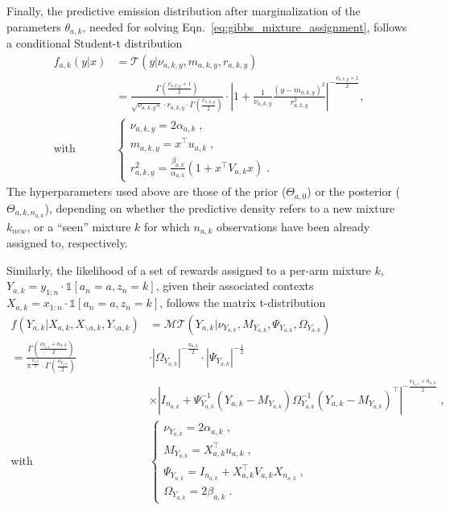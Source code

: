 \documentclass{article}
\newcommand{\mydet}[1]{\left| #1 \right|}
\newcommand{\T}[1]{\mathcal{T}\left( #1\right)}
\newcommand{\MT}[1]{\mathcal{MT}\left( #1\right)}
\begin{document}
Finally, the predictive emission distribution after marginalization of the parameters $\theta_{a,k}$, needed for solving Eqn.~\eqref{eq:gibbs_mixture_assignment}, follows a conditional Student-t distribution
\begin{equation}
\begin{split}
f_{a,k}(y|x) & = \T{y|\nu_{a,k,y}, m_{a,k,y}, r_{a,k,y}} \\
	&= \frac{\Gamma\left(\frac{\nu_{a,k,y}+1}{2}\right)}{\sqrt{\nu_{a,k,y} \pi} \cdot r_{a,k,y} \cdot \Gamma\left(\frac{\nu_{a,k,y}}{2}\right)} \cdot \mydet{1+\frac{1}{\nu_{a,k,y}}\frac{(y-m_{a,k,y})^2}{r_{a,k,y}^2}}^{-\frac{\nu_{a,k,y}+1}{2}} , \\
\text{with } &\begin{cases}
\nu_{a,k,y}=2\alpha_{a,k} \;, \\
m_{a,k,y} = x^\top u_{a,k} \;,\\
r_{a,k,y}^2 = \frac{\beta_{a,k}}{\alpha_{a,k}} (1+x^\top V_{a,k} x) \; .
\end{cases}
\end{split}
\end{equation}
The hyperparameters used above are those of the prior ($\Theta_{a,0}$) or the posterior ($\Theta_{a,k,n_{a,k}}$), depending on whether the predictive density refers to a new mixture $k_{new}$, or a ``seen'' mixture $k$ for which $n_{a,k}$ observations have been already assigned to, respectively.

Similarly, the likelihood of a set of rewards assigned to a per-arm mixture $k$, $Y_{a,k}=y_{1:n}\cdot \mathds{1}[a_n=a,z_n=k]$, given their associated contexts $X_{a,k}=x_{1:n} \cdot \mathds{1}[a_n=a,z_n=k]$, follows the matrix t-distribution
\begin{equation}
\begin{split}
f(Y_{a,k}|X_{a,k},X_{\backslash a,k},Y_{\backslash a,k}) &= \MT{Y_{a,k}|\nu_{Y_{a,k}}, M_{Y_{a,k}}, \Psi_{Y_{a,k}}, \Omega_{Y_{a,k}}} \\
=\frac{\Gamma\left(\frac{\nu_{Y_{a,k}}+n_{a,k}}{2}\right)}{\pi^{\frac{n_{a,k}}{2}} \cdot \Gamma\left(\frac{\nu_{Y_{a,k}}}{2}\right)} & \cdot 
\mydet{\Omega_{Y_{a,k}}}^{-\frac{n_{a,k}}{2}} \cdot \mydet{\Psi_{Y_{a,k}}}^{-\frac{1}{2}} \\
& \times 
\mydet{I_{n_{a,k}}+\Psi_{Y_{a,k}}^{-1}\left(Y_{a,k}-M_{Y_{a,k}}\right)\Omega_{Y_{a,k}}^{-1}\left(Y_{a,k}-M_{Y_{a,k}}\right)^\top}^{-\frac{\nu_{Y_{a,k}}+n_{a,k}}{2}} \; ,\\
\text{with } &\begin{cases}
\nu_{Y_{a,k}}=2 \alpha_{a,k} \;, \\
M_{Y_{a,k}}= X_{a,k}^\top u_{a,k} \;,\\
\Psi_{Y_{a,k}} = I_{n_{a,k}} + X_{a,k}^\top V_{a,k} X_{n_{a,k}} \;,\\
\Omega_{Y_{a,k}} = 2 \beta_{a,k} \;.
\end{cases} \\
\end{split}
\end{equation}
\end{document}
